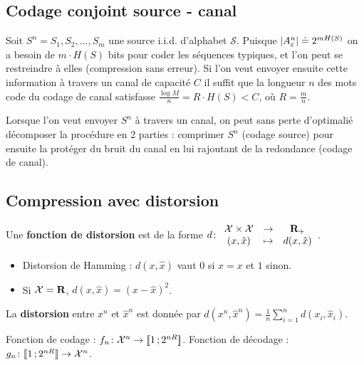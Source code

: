 \subsection{Codage conjoint source - canal}

	Soit $S^n = S_1, S_2, \ldots, S_m$ une source i.i.d. d'alphabet $\mathcal{S}$.
	Puisque $\left\lvert A_\varepsilon^n\right\rvert \doteq 2^{m H(S)}$ on a besoin de $m \cdot H(S)$ bits pour coder les séquences typiques, et l'on peut se restreindre à elles (compression sans erreur).
	Si l’on veut envoyer ensuite cette information à travers un canal de capacité $C$ il suffit que la longueur $n$ des mots code du codage de canal satisfasse $\frac{\log M}{n} = R \cdot H(S) < C$, où $R = \frac{m}{n}$.

	Lorsque l’on veut envoyer $S^n$ à travers un canal, on peut sans perte d’optimalié décomposer la procédure en 2 parties : comprimer $S^n$ (codage source) pour ensuite la protéger du bruit du canal en lui rajoutant de la redondance (codage de canal).


\subsection{Compression avec distorsion}

	\begin{defn}
		Une \textbf{fonction de distorsion} est de la forme
		$d \colon \begin{array}{ccc}
			\mathcal{X} \times \mathcal{X} & \to & \mathbf{R}_+ \\
			(x,\hat{x}) & \mapsto & d(x,\hat{x})
			\end{array}$.
	\end{defn}
	
	\begin{ex}
		\begin{itemize}
			\item[\textbullet] Distorsion de Hamming : $d(x,\hat{x})$ vaut $0$ si $\hat{x} = x$ et $1$ sinon.
			\item[\textbullet] Si $\mathcal{X} = \mathbf{R}$, $d(x,\hat{x}) = (x - \hat{x})^2$.
		\end{itemize}
	\end{ex}

	\begin{defn}
		La \textbf{distorsion} entre $x^n$ et $\hat{x}^n$ est donnée par $d(x^n,\hat{x}^n) = \frac{1}{n} \sum_{i = 1}^n d(x_i, \hat{x}_i)$.
	\end{defn}

	\begin{note}
		Fonction de codage : $f_n \colon \mathcal{X}^n \to \mathopen{[\![}1\mathclose{}\mathpunct{};2^{nR}\mathclose{]\!]}$.
		Fonction de décodage : $g_n \colon \mathopen{[\![}1\mathclose{}\mathpunct{};2^{nR}\mathclose{]\!]} \to \mathcal{X}^n$.
	\end{note}


